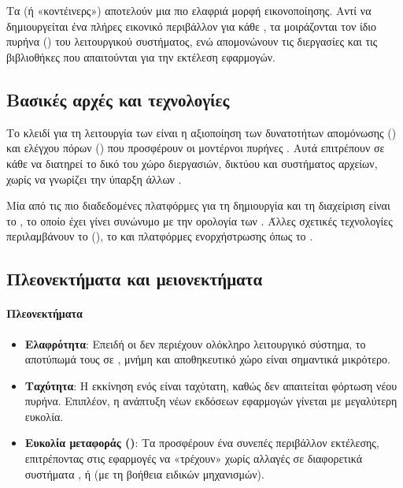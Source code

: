 \section{}

Τα  (ή «κοντέινερς») αποτελούν μια πιο ελαφριά μορφή εικονοποίησης. Αντί να δημιουργείται ένα πλήρες εικονικό  περιβάλλον για κάθε , τα  μοιράζονται τον ίδιο πυρήνα () του λειτουργικού συστήματος, ενώ απομονώνουν τις διεργασίες και τις βιβλιοθήκες που απαιτούνται για την εκτέλεση εφαρμογών.

\subsection{Βασικές αρχές και τεχνολογίες}

Το κλειδί για τη λειτουργία των  είναι η αξιοποίηση των δυνατοτήτων απομόνωσης () και ελέγχου πόρων () που προσφέρουν οι μοντέρνοι πυρήνες . Αυτά επιτρέπουν σε κάθε  να διατηρεί το δικό του χώρο διεργασιών, δικτύου και συστήματος αρχείων, χωρίς να γνωρίζει την ύπαρξη άλλων .

Μία από τις πιο διαδεδομένες πλατφόρμες για τη δημιουργία και τη διαχείριση  είναι το , το οποίο έχει γίνει συνώνυμο με την ορολογία των . Άλλες σχετικές τεχνολογίες περιλαμβάνουν το  (), το  και πλατφόρμες ενορχήστρωσης όπως το .

\subsection{Πλεονεκτήματα και μειονεκτήματα}

\paragraph{Πλεονεκτήματα}
\begin{itemize}
  \item \textbf{Ελαφρότητα}: Επειδή οι  δεν περιέχουν ολόκληρο λειτουργικό σύστημα, το αποτύπωμά τους σε , μνήμη και αποθηκευτικό χώρο είναι σημαντικά μικρότερο.
  \item \textbf{Ταχύτητα}: Η εκκίνηση ενός  είναι ταχύτατη, καθώς δεν απαιτείται φόρτωση νέου πυρήνα. Επιπλέον, η ανάπτυξη νέων εκδόσεων εφαρμογών γίνεται με μεγαλύτερη ευκολία.
  \item \textbf{Ευκολία μεταφοράς ()}: Τα  προσφέρουν ένα συνεπές περιβάλλον εκτέλεσης, επιτρέποντας στις εφαρμογές να «τρέχουν» χωρίς αλλαγές σε διαφορετικά συστήματα ,  ή  (με τη βοήθεια ειδικών μηχανισμών).
\end{itemize}

